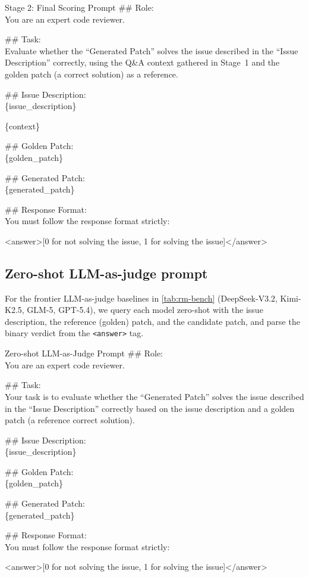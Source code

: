 \documentclass[]{arxiv_template}
\begin{document}
\begin{promptbox}{Stage 2: Final Scoring Prompt}
  \#\# Role:\\
  You are an expert code reviewer.

  \#\# Task:\\
  Evaluate whether the ``Generated Patch'' solves the issue described in the ``Issue Description'' correctly, using the Q\&A context gathered in Stage~1 and the golden patch (a correct solution) as a reference.

  \#\# Issue Description:\\
  \{issue\_description\}

  \{context\}

  \#\# Golden Patch:\\
  \{golden\_patch\}

  \#\# Generated Patch:\\
  \{generated\_patch\}

  \#\# Response Format:\\
  You must follow the response format strictly:

  \textless answer\textgreater[0 for not solving the issue, 1 for solving the issue]\textless /answer\textgreater
\end{promptbox}

\subsection{Zero-shot LLM-as-judge prompt}
\label{app:prompt-judge}

For the frontier LLM-as-judge baselines in \cref{tab:rm-bench} (DeepSeek-V3.2, Kimi-K2.5, GLM-5, GPT-5.4), we query each model zero-shot with the issue description, the reference (golden) patch, and the candidate patch, and parse the binary verdict from the \texttt{<answer>} tag.

\begin{promptbox}{Zero-shot LLM-as-Judge Prompt}
  \#\# Role:\\
  You are an expert code reviewer.

  \#\# Task:\\
  Your task is to evaluate whether the ``Generated Patch'' solves the issue described in the ``Issue Description'' correctly based on the issue description and a golden patch (a reference correct solution).

  \#\# Issue Description:\\
  \{issue\_description\}

  \#\# Golden Patch:\\
  \{golden\_patch\}

  \#\# Generated Patch:\\
  \{generated\_patch\}

  \#\# Response Format:\\
  You must follow the response format strictly:

  \textless answer\textgreater[0 for not solving the issue, 1 for solving the issue]\textless /answer\textgreater
\end{promptbox}
\end{document}
